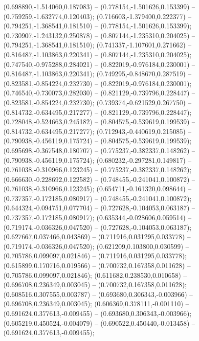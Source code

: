  (0.698890,-1.514060,0.187083) -- (0.778154,-1.501626,0.153399) -- (0.759259,-1.632774,0.120403);
 (0.716603,-1.379400,0.222377) -- (0.794251,-1.368541,0.181510) -- (0.778154,-1.501626,0.153399);
 (0.730907,-1.243132,0.250878) -- (0.807144,-1.235310,0.204025) -- (0.794251,-1.368541,0.181510);
 (0.741337,-1.107601,0.271662) -- (0.816487,-1.103863,0.220341) -- (0.807144,-1.235310,0.204025);
 (0.747540,-0.975288,0.284021) -- (0.822019,-0.976184,0.230001) -- (0.816487,-1.103863,0.220341);
 (0.749295,-0.848670,0.287519) -- (0.823581,-0.854224,0.232730) -- (0.822019,-0.976184,0.230001);
 (0.746540,-0.730073,0.282030) -- (0.821129,-0.739796,0.228447) -- (0.823581,-0.854224,0.232730);
 (0.739374,-0.621529,0.267750) -- (0.814732,-0.634495,0.217277) -- (0.821129,-0.739796,0.228447);
 (0.728048,-0.524663,0.245182) -- (0.804575,-0.539619,0.199539) -- (0.814732,-0.634495,0.217277);
 (0.712943,-0.440619,0.215085) -- (0.790938,-0.456119,0.175724) -- (0.804575,-0.539619,0.199539);
 (0.695698,-0.367548,0.180707) -- (0.775237,-0.382337,0.148262) -- (0.790938,-0.456119,0.175724);
 (0.680232,-0.297281,0.149817) -- (0.761038,-0.310966,0.123245) -- (0.775237,-0.382337,0.148262);
 (0.666630,-0.228692,0.122582) -- (0.748455,-0.241041,0.100872) -- (0.761038,-0.310966,0.123245);
 (0.654711,-0.161320,0.098644) -- (0.737357,-0.172185,0.080917) -- (0.748455,-0.241041,0.100872);
 (0.644324,-0.094751,0.077704) -- (0.727628,-0.104053,0.063187) -- (0.737357,-0.172185,0.080917);
 (0.635344,-0.028606,0.059514) -- (0.719174,-0.036326,0.047520) -- (0.727628,-0.104053,0.063187);
 (0.627667,0.037466,0.043869) -- (0.711916,0.031295,0.033778) -- (0.719174,-0.036326,0.047520);
 (0.621209,0.103800,0.030599) -- (0.705786,0.099097,0.021846) -- (0.711916,0.031295,0.033778);
 (0.615899,0.170716,0.019566) -- (0.700732,0.167358,0.011628) -- (0.705786,0.099097,0.021846);
 (0.611682,0.238530,0.010658) -- (0.696708,0.236349,0.003045) -- (0.700732,0.167358,0.011628);
 (0.608516,0.307555,0.003787) -- (0.693680,0.306343,-0.003966) -- (0.696708,0.236349,0.003045);
 (0.606369,0.378111,-0.001110) -- (0.691624,0.377613,-0.009455) -- (0.693680,0.306343,-0.003966);
 (0.605219,0.450524,-0.004079) -- (0.690522,0.450440,-0.013458) -- (0.691624,0.377613,-0.009455);
